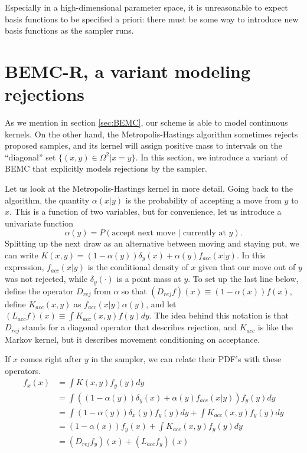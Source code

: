 \documentclass{article}
\begin{document}
Especially in a high-dimensional parameter space, it is unreasonable to expect basis functions to be specified a priori: there must be some way to introduce new basis functions as the sampler runs. 

\section{BEMC-R, a variant modeling rejections}
\label{sec:BEMC-R}

As we mention in section \ref{sec:BEMC}, our scheme is able to model continuous kernels. On the other hand, the Metropolis-Hastings algorithm sometimes rejects proposed samples, and its kernel will assign positive mass to intervals on the ``diagonal'' set $\{(x,y) \in \Omega^2 | x=y\}$. In this section, we introduce a variant of BEMC that explicitly models rejections by the sampler. 

Let us look at the Metropolis-Hastings kernel in more detail. Going back to the algorithm, the quantity $\alpha(x|y)$ is the probability of accepting a move from $y$ to $x$. This is a function of two variables, but for convenience, let us introduce a univariate function $$\alpha(y)=P(\text{accept next move $|$ currently at }y).$$ Splitting up the next draw as an alternative between moving and staying put, we can write $K(x, y) = (1-\alpha(y))\delta_{y}(x) + \alpha(y)f_{acc}(x|y)$. In this expression, $f_{acc}(x|y)$ is the conditional density of $x$ given that our move out of $y$ was not rejected, while $\delta_y(\cdot)$ is a point mass at $y$. %
To set up the last line below, define the operator $D_{rej}$ from $\alpha$ so that $(D_{rej}f)(x)\equiv (1-\alpha(x))f(x)$, define $K_{acc}(x,y)$ as $f_{acc}(x|y)\alpha(y)$, and let $(L_{acc}f)(x)\equiv \int K_{acc}(x,y)f(y)dy$. The idea behind this notation is that $D_{rej}$ stands for a diagonal operator that describes rejection, and $K_{acc}$ is like the Markov kernel, but it describes movement conditioning on acceptance.

If $x$ comes right after $y$ in the sampler, we can relate their PDF's with these operators.
\begin{align*}
 f_x(x) &= \int K(x, y)f_y(y)dy \\
&= \int ((1-\alpha(y))\delta_{y}(x) + \alpha(y)f_{acc}(x|y))f_y(y)dy \\
&= \int (1-\alpha(y))\delta_{x}(y)f_y(y)dy + \int K_{acc}(x,y)f_y(y)dy \\
&=  (1-\alpha(x))f_y(x) + \int K_{acc}(x,y)f_y(y)dy \\
&=  (D_{rej}f_y)(x) + (L_{acc}f_y)(x) \\
\end{align*}
\end{document}
